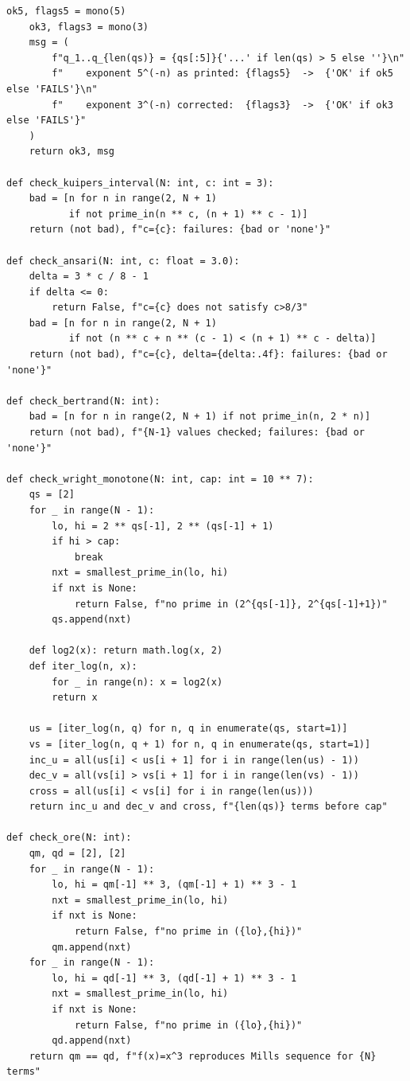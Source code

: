 \documentclass[11pt,reqno]{amsart}
\theoremstyle{redplain}
\numberwithin{equation}{section}
\begin{document}
\begin{lstlisting}[style=python]
    ok5, flags5 = mono(5)
    ok3, flags3 = mono(3)
    msg = (
        f"q_1..q_{len(qs)} = {qs[:5]}{'...' if len(qs) > 5 else ''}\n"
        f"    exponent 5^(-n) as printed: {flags5}  ->  {'OK' if ok5 else 'FAILS'}\n"
        f"    exponent 3^(-n) corrected:  {flags3}  ->  {'OK' if ok3 else 'FAILS'}"
    )
    return ok3, msg

def check_kuipers_interval(N: int, c: int = 3):
    bad = [n for n in range(2, N + 1)
           if not prime_in(n ** c, (n + 1) ** c - 1)]
    return (not bad), f"c={c}: failures: {bad or 'none'}"

def check_ansari(N: int, c: float = 3.0):
    delta = 3 * c / 8 - 1
    if delta <= 0:
        return False, f"c={c} does not satisfy c>8/3"
    bad = [n for n in range(2, N + 1)
           if not (n ** c + n ** (c - 1) < (n + 1) ** c - delta)]
    return (not bad), f"c={c}, delta={delta:.4f}: failures: {bad or 'none'}"

def check_bertrand(N: int):
    bad = [n for n in range(2, N + 1) if not prime_in(n, 2 * n)]
    return (not bad), f"{N-1} values checked; failures: {bad or 'none'}"

def check_wright_monotone(N: int, cap: int = 10 ** 7):
    qs = [2]
    for _ in range(N - 1):
        lo, hi = 2 ** qs[-1], 2 ** (qs[-1] + 1)
        if hi > cap:
            break
        nxt = smallest_prime_in(lo, hi)
        if nxt is None:
            return False, f"no prime in (2^{qs[-1]}, 2^{qs[-1]+1})"
        qs.append(nxt)

    def log2(x): return math.log(x, 2)
    def iter_log(n, x):
        for _ in range(n): x = log2(x)
        return x

    us = [iter_log(n, q) for n, q in enumerate(qs, start=1)]
    vs = [iter_log(n, q + 1) for n, q in enumerate(qs, start=1)]
    inc_u = all(us[i] < us[i + 1] for i in range(len(us) - 1))
    dec_v = all(vs[i] > vs[i + 1] for i in range(len(vs) - 1))
    cross = all(us[i] < vs[i] for i in range(len(us)))
    return inc_u and dec_v and cross, f"{len(qs)} terms before cap"

def check_ore(N: int):
    qm, qd = [2], [2]
    for _ in range(N - 1):
        lo, hi = qm[-1] ** 3, (qm[-1] + 1) ** 3 - 1
        nxt = smallest_prime_in(lo, hi)
        if nxt is None:
            return False, f"no prime in ({lo},{hi})"
        qm.append(nxt)
    for _ in range(N - 1):
        lo, hi = qd[-1] ** 3, (qd[-1] + 1) ** 3 - 1
        nxt = smallest_prime_in(lo, hi)
        if nxt is None:
            return False, f"no prime in ({lo},{hi})"
        qd.append(nxt)
    return qm == qd, f"f(x)=x^3 reproduces Mills sequence for {N} terms"


\end{lstlisting}
\end{document}
